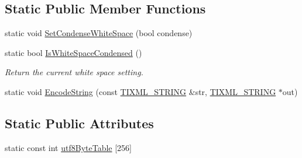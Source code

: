 \subsection*{Static Public Member Functions}
\begin{DoxyCompactItemize}
\item 
static void \hyperlink{class_ti_xml_base_a0f799ec645bfb8d8a969e83478f379c1}{Set\+Condense\+White\+Space} (bool condense)
\item 
static bool \hyperlink{class_ti_xml_base_ad4b1472531c647a25b1840a87ae42438}{Is\+White\+Space\+Condensed} ()
\begin{DoxyCompactList}\small\item\em Return the current white space setting. \end{DoxyCompactList}\item 
static void \hyperlink{class_ti_xml_base_a32ed202562b58de64c7d799ca3c9db98}{Encode\+String} (const \hyperlink{tinyxml_8h_a92bada05fd84d9a0c9a5bbe53de26887}{T\+I\+X\+M\+L\+\_\+\+S\+T\+R\+I\+NG} \&str, \hyperlink{tinyxml_8h_a92bada05fd84d9a0c9a5bbe53de26887}{T\+I\+X\+M\+L\+\_\+\+S\+T\+R\+I\+NG} $\ast$out)
\end{DoxyCompactItemize}
\subsection*{Static Public Attributes}
\begin{DoxyCompactItemize}
\item 
static const int \hyperlink{class_ti_xml_base_ac8c86058137bdb4b413c3eca58f2d467}{utf8\+Byte\+Table} \mbox{[}256\mbox{]}
\end{DoxyCompactItemize}

